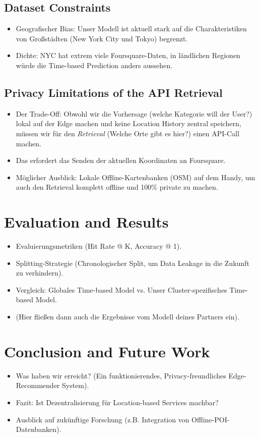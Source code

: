 \documentclass[11pt, a4paper]{article}
\begin{document}
\subsection{Dataset Constraints}
\begin{itemize}
    \item Geografischer Bias: Unser Modell ist aktuell stark auf die Charakteristiken von Großstädten (New York City und Tokyo) begrenzt.
    \item Dichte: NYC hat extrem viele Foursquare-Daten, in ländlichen Regionen würde die Time-based Prediction anders aussehen.
\end{itemize}

\subsection{Privacy Limitations of the API Retrieval}
\begin{itemize}
    \item Der Trade-Off: Obwohl wir die Vorhersage (welche Kategorie will der User?) lokal auf der Edge machen und keine Location History zentral speichern, müssen wir für den \textit{Retrieval} (Welche Orte gibt es hier?) einen API-Call machen.
    \item Das erfordert das Senden der aktuellen Koordinaten an Foursquare. 
    \item Möglicher Ausblick: Lokale Offline-Kartenbanken (OSM) auf dem Handy, um auch den Retrieval komplett offline und 100\% private zu machen.
\end{itemize}

\section{Evaluation and Results}
\begin{itemize}
    \item Evaluierungsmetriken (Hit Rate @ K, Accuracy @ 1).
    \item Splitting-Strategie (Chronologischer Split, um Data Leakage in die Zukunft zu verhindern).
    \item Vergleich: Globales Time-based Model vs. Unser Cluster-spezifisches Time-based Model.
    \item (Hier fließen dann auch die Ergebnisse vom Modell deines Partners ein).
\end{itemize}

\section{Conclusion and Future Work}
\begin{itemize}
    \item Was haben wir erreicht? (Ein funktionierendes, Privacy-freundliches Edge-Recommender System).
    \item Fazit: Ist Dezentralisierung für Location-based Services machbar?
    \item Ausblick auf zukünftige Forschung (z.B. Integration von Offline-POI-Datenbanken).
\end{itemize}
\end{document}
